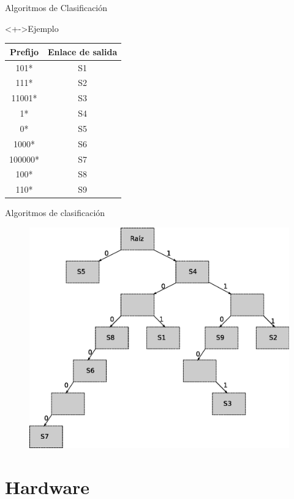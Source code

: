 \documentclass[xcolor=dvipsnames]{beamer}
\begin{document}
\begin{frame}{Algoritmos de Clasificación}
  \begin{block}<+->{Ejemplo}   
	\begin{center}
	\begin{tabular}{|c|c|} \hline
		\textbf{Prefijo} & \textbf{Enlace de salida} \\ \hline
		101* & S1 \\
		111* & S2 \\
		11001* & S3 \\
		1* & S4 \\
		0* & S5 \\
		1000* & S6 \\
		100000* & S7 \\
		100* & S8 \\
		110* & S9 \\	\hline
	\end{tabular}	
\end{center}

  \end{block}
\end{frame}

\begin{frame}{Algoritmos de clasificación}
\begin{figure}
\centering 
\includegraphics[scale=0.40]{figures/trie.eps}
\end{figure}
\end{frame}

\section{Hardware}
\end{document}
